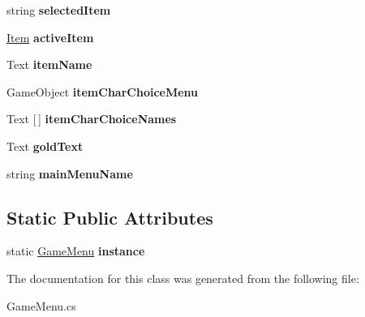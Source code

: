 \begin{DoxyCompactItemize}
string {\bfseries selected\+Item}
\item 
\mbox{\label{class_game_menu_a038e3f3c597324f13946e2ba12eecabc}} 
\mbox{\hyperlink{class_item}{Item}} {\bfseries active\+Item}
\item 
\mbox{\label{class_game_menu_a36453f43505af76469c9a23fe41bda5c}} 
Text {\bfseries item\+Name}
\item 
\mbox{\label{class_game_menu_abf5c98d18c6c829ac0ea3e670b83e880}} 
Game\+Object {\bfseries item\+Char\+Choice\+Menu}
\item 
\mbox{\label{class_game_menu_a62f8ec7329d6465dc1e49e2c439ecd22}} 
Text \mbox{[}$\,$\mbox{]} {\bfseries item\+Char\+Choice\+Names}
\item 
\mbox{\label{class_game_menu_aba402478f6145ead22c881fe79f267c5}} 
Text {\bfseries gold\+Text}
\item 
\mbox{\label{class_game_menu_a281f4eb24b9c9d6d745f7c3508f2cde7}} 
string {\bfseries main\+Menu\+Name}
\end{DoxyCompactItemize}
\subsection*{Static Public Attributes}
\begin{DoxyCompactItemize}
\item 
\mbox{\label{class_game_menu_ae451260e29ae28429e723104c82c2c3d}} 
static \mbox{\hyperlink{class_game_menu}{Game\+Menu}} {\bfseries instance}
\end{DoxyCompactItemize}


The documentation for this class was generated from the following file\+:\begin{DoxyCompactItemize}
\item 
Game\+Menu.\+cs\end{DoxyCompactItemize}
